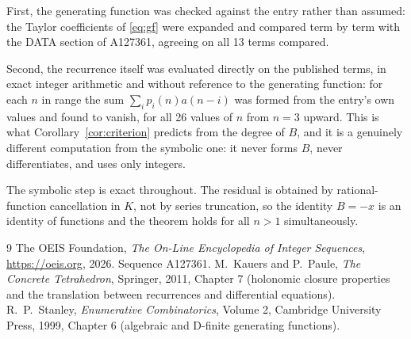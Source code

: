 \documentclass[11pt,a4paper]{article}
\theoremstyle{plain}
\theoremstyle{definition}
\begin{document}
First, the generating function was checked against the entry rather than assumed: the
Taylor coefficients of \eqref{eq:gf} were expanded and compared term by term with the DATA
section of A127361, agreeing on all 13 terms compared.

Second, the recurrence itself was evaluated directly on the published terms, in exact
integer arithmetic and without reference to the generating function: for each $n$ in range
the sum $\sum_{i}p_{i}(n)a(n-i)$ was formed from the entry's own values and found to
vanish, for all 26 values of $n$ from $n=3$ upward. This is what
Corollary~\ref{cor:criterion} predicts from the degree of $B$, and it is a genuinely
different computation from the symbolic one: it never forms $B$, never differentiates, and
uses only integers.

The symbolic step is exact throughout. The residual is obtained by rational-function
cancellation in $K$, not by series truncation, so the identity $B=- x$ is an
identity of functions and the theorem holds for all $n>1$ simultaneously.

\begin{thebibliography}{9}
 The OEIS Foundation, \emph{The On-Line Encyclopedia of Integer Sequences},
\url{https://oeis.org}, 2026. Sequence A127361.
 M.~Kauers and P.~Paule, \emph{The Concrete Tetrahedron}, Springer, 2011,
Chapter 7 (holonomic closure properties and the translation between recurrences and
differential equations).
 R.~P.~Stanley, \emph{Enumerative Combinatorics}, Volume 2, Cambridge
University Press, 1999, Chapter 6 (algebraic and D-finite generating functions).
\end{thebibliography}
\end{document}
